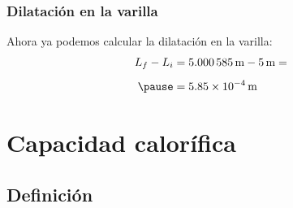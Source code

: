 \documentclass[14pt]{beamer}
\begin{document}
\begin{frame}
\frametitle{Dilatación en la varilla}
Ahora ya podemos calcular la dilatación en la varilla:
\pause
\begin{eqnarray*}
\begin{aligned}
L_{f} - L_{i} &= \SI{5.000585}{\meter} - \SI{5}{\meter} = \\[0.5em] \pause
&= \SI{5.85d-4}{\meter}
\end{aligned}
\end{eqnarray*}
\end{frame}

\section{Capacidad calorífica}
\subsection{Definición}
\end{document}
